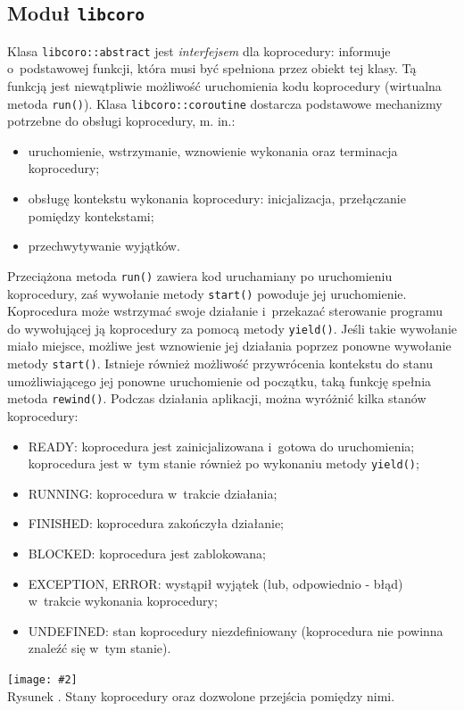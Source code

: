 \documentclass[12pt,makeidx]{mwart}
\newcommand{\code}{\texttt}
\newcommand{\procbr}{()}
\newcounter{figmain}
\newcommand{\myownfigure}[4]{ \newcounter{#1} \setcounter{#1}{\value{figmain}} \addtocounter{figmain}{1} \begin{center} \label{fig:#1} \centering \texttt{[image: \#2]}\\ \nopagebreak[4] Rysunek \arabic{#1}. #3. \end{center}}
\begin{document}
\subsection{Moduł \code{libcoro}}
\label{sec:coroutine}
%
\indent
	Klasa \code{libcoro::abstract} jest \emph{interfejsem} dla koprocedury: informuje o~podstawowej funkcji, która musi być spełniona
	przez obiekt tej klasy. Tą funkcją jest niewątpliwie możliwość uruchomienia kodu koprocedury (wirtualna metoda \code{run()}).
	Klasa \code{libcoro::coroutine} dostarcza podstawowe mechanizmy potrzebne do obsługi koprocedury, m. in.:
	\begin{itemize}
		\item uruchomienie, wstrzymanie, wznowienie wykonania oraz terminacja koprocedury;
		\item obsługę kontekstu wykonania koprocedury: inicjalizacja, przełączanie pomiędzy kontekstami;
		\item przechwytywanie wyjątków.
	\end{itemize}
	Przeciążona metoda \code{run()} zawiera kod uruchamiany po uruchomieniu koprocedury,
	zaś wywołanie metody \code{start()} powoduje jej uruchomienie.
	Koprocedura może wstrzymać swoje działanie i~przekazać sterowanie programu do wywołującej ją koprocedury za pomocą metody \code{yield()}.
	Jeśli takie wywołanie miało miejsce, możliwe jest wznowienie jej działania poprzez ponowne wywołanie metody \code{start()}.
	Istnieje również możliwość przywrócenia kontekstu do stanu umożliwiającego jej ponowne uruchomienie od początku, taką funkcję spełnia
	metoda \code{rewind\procbr}.
	Podczas działania aplikacji, można wyróżnić kilka stanów koprocedury:
	\begin{itemize}
		\item READY: koprocedura jest zainicjalizowana i~gotowa do uruchomienia; koprocedura jest w~tym stanie również po wykonaniu metody
			\code{yield\procbr};
		\item RUNNING: koprocedura w~trakcie działania;
		\item FINISHED: koprocedura zakończyła działanie;
		\item BLOCKED: koprocedura jest zablokowana;
		\item EXCEPTION, ERROR: wystąpił wyjątek (lub, odpowiednio - błąd) w~trakcie wykonania koprocedury;
		\item UNDEFINED: stan koprocedury niezdefiniowany (koprocedura nie powinna znaleźć się w~tym stanie).
	\end{itemize}
	\begin{center}
		\myownfigure{LibcoroStates}{LibcoroStates.png}{Stany koprocedury oraz dozwolone przejścia pomiędzy nimi}{.7}
	\end{center}
\end{document}
